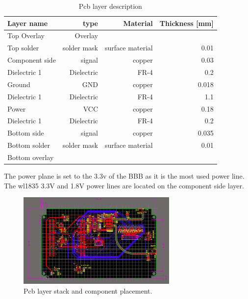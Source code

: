 \begin{table}[!htbp]
  \begin{center}
    \begin{tabular}{|l|r|r|r|}%
      \hline
        Layer name & type & Material & Thickness [mm] \\ \hline \hline
        Top Overlay & Overlay & & \\ \hline
        Top solder & solder mask & surface material & 0.01 \\ \hline
        Component side & signal & copper & 0.03 \\ \hline
        Dielectric 1 & Dielectric & FR-4 & 0.2 \\ \hline
        Ground & GND & copper & 0.018\\ \hline
        Dielectric 1 & Dielectric & FR-4 & 1.1 \\ \hline
        Power & VCC & copper & 0.18 \\ \hline
        Dielectric 1 & Dielectric & FR-4 & 0.2 \\ \hline
        Bottom side & signal & copper & 0.035 \\ \hline
        Bottom solder & solder mask & surface material & 0.01 \\ \hline
        Bottom overlay & & &  \\ \hline

    \end{tabular}
  \end{center}
  \caption {Pcb layer description} \label{tab:layer description}
\end{table}

The power plane is set to the 3.3v of the BBB as it is the most used power line. The wl1835 3.3V and 1.8V power lines are located on the component side layer.

\begin{figure}[h]
    \centering
    \includegraphics[width=0.7\textwidth,keepaspectratio]{chap/hardFig/pcb_all_layers}
    \caption{Pcb layer stack and component placement.}
    \label{fig:pcb layer stack}
\end{figure}

